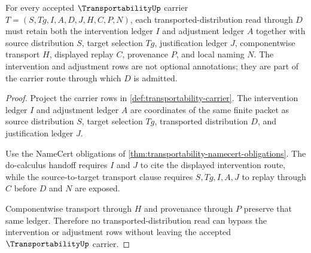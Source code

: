 \begin{theorem}
\label{thm:transportability-intervention-adjustment-ledger}
For every accepted $\TransportabilityUp$ carrier $T=(S,Tg,I,A,D,J,H,C,P,N)$, each transported-distribution read through $D$ must retain both the intervention ledger $I$ and adjustment ledger $A$ together with source distribution $S$, target selection $Tg$, justification ledger $J$, componentwise transport $H$, displayed replay $C$, provenance $P$, and local naming $N$. The intervention and adjustment rows are not optional annotations; they are part of the carrier route through which $D$ is admitted.
\end{theorem}
\begin{proof}
Project the carrier rows in \autoref{def:transportability-carrier}. The intervention ledger $I$ and adjustment ledger $A$ are coordinates of the same finite packet as source distribution $S$, target selection $Tg$, transported distribution $D$, and justification ledger $J$.

Use the NameCert obligations of \autoref{thm:transportability-namecert-obligations}. The do-calculus handoff requires $I$ and $J$ to cite the displayed intervention route, while the source-to-target transport clause requires $S,Tg,I,A,J$ to replay through $C$ before $D$ and $N$ are exposed.

Componentwise transport through $H$ and provenance through $P$ preserve that same ledger. Therefore no transported-distribution read can bypass the intervention or adjustment rows without leaving the accepted $\TransportabilityUp$ carrier.
\end{proof}

